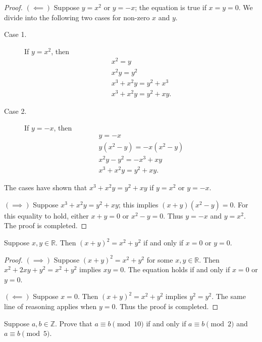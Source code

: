 \documentclass{exam}
\begin{document}
\begin{proof}
    $(\impliedby)$ Suppose $y=x^2$ or $y=-x$; the equation is true if $x = y = 0$. We divide into the following two cases for non-zero $x$ and $y$.
    \begin{description}
        \item[Case 1. ] If $y=x^2$, then
        \begin{gather*}
            x^2 = y\\
            x^2y = y^2\\
            x^3 +x^2y = y^2 + x^3\\
            x^3 + x^2y = y^2 +xy.
        \end{gather*}
        \item[Case 2. ] If $y = -x$, then
        \begin{gather*}
            y = -x\\
            y(x^2-y)=-x(x^2-y)\\
            x^2y - y^2 = -x^3 + xy\\
            x^3+x^2y = y^2 + xy.
        \end{gather*} 
    \end{description}
    The cases have shown that $x^3 + x^2y = y^2 + xy$ if $y = x^2$ or $y = -x$.

    $(\implies)$ Suppose $x^3 + x^2y = y^2 + xy$; this implies $(x+y)(x^2-y) = 0$. For this equality to hold, either $x + y = 0$ or $x^2 - y = 0$. Thus $y = -x$ and $y = x^2$. The proof is completed.
\end{proof}

\begin{proposition}{7.7}
    Suppose $x,y\in\mathbb R$. Then $(x+y)^2=x^2+y^2$ if and only if $x=0$ or $y=0$.
\end{proposition}

\begin{proof}
    $(\implies)$ Suppose $(x+y)^2 = x^2 + y^2$ for some $x,y\in\mathbb R$. Then $x^2+2xy +y^2 = x^2 + y^2$ implies $xy = 0$. The equation holds if and only if $x = 0$ or $y = 0$.

    $(\impliedby)$ Suppose $x = 0$. Then $(x+y)^2 = x^2 + y^2$ implies $y^2 = y^2$. The same line of reasoning applies when $y=0$. Thus the proof is completed.
\end{proof}

\begin{proposition}{7.8}
    Suppose $a, b\in\mathbb Z$. Prove that $a\equiv b\pmod{10}$ if and only if $a\equiv b\pmod2$ and $a\equiv b\pmod5$.
\end{proposition}
\end{document}
